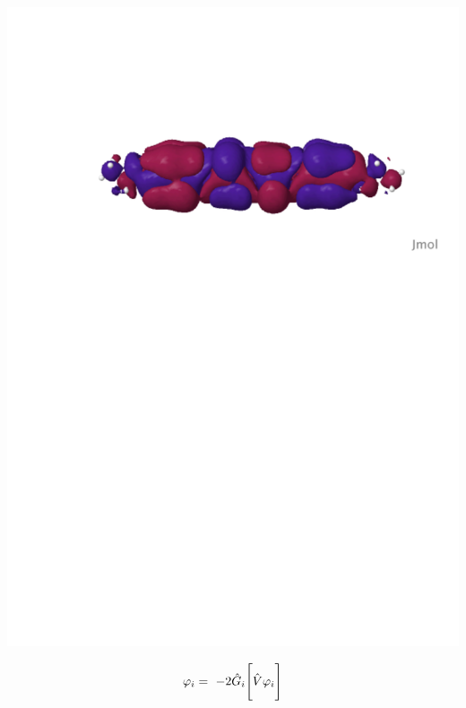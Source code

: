 \begin{frame}
\begin{columns}
\begin{column}[b]{0.48\linewidth}
    \includegraphics[scale=0.25, clip, viewport = 80 560 600 700]{figures/can_orb_2.pdf}\\

    \vspace{2mm}

    \begin{equation}
        \nonumber
        \varphi_i =\ -2\hat{G}_i\Bigg[\hat{V} \varphi_i\Bigg]
    \end{equation}
    \end{column}


\end{columns}
\end{frame}
